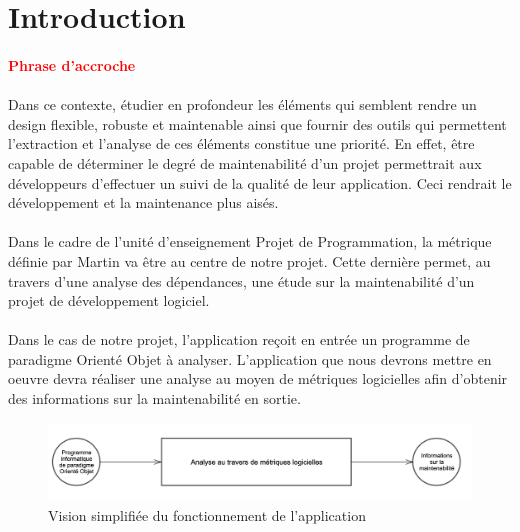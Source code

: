 \documentclass{scrartcl}
\newcommand{\TODO}[1] {
    \noindent \paragraph{\textcolor{red}{#1}}
}
\begin{document}

\section{Introduction}
    
    \TODO{Phrase d'accroche}

    \paragraph{}Dans ce contexte, étudier en profondeur les éléments qui semblent rendre un design flexible, robuste et maintenable ainsi que fournir des outils qui permettent l'extraction et l'analyse de ces éléments constitue une priorité. En effet, être capable de déterminer le degré de maintenabilité d'un projet permettrait aux développeurs d'effectuer un suivi de la qualité de leur application. Ceci rendrait le développement et la maintenance plus aisés.

    \paragraph{}Dans le cadre de l'unité d'enseignement \og Projet de Programmation\fg, la métrique définie par Martin\cite{Martin:1994} va être au centre de notre projet. Cette dernière permet, au travers d'une analyse des dépendances, une étude sur la maintenabilité d'un projet de développement logiciel.

    \paragraph{}Dans le cas de notre projet, l'application reçoit en entrée un programme de paradigme Orienté Objet à analyser. L'application que nous devrons mettre en oeuvre devra réaliser une analyse au moyen de métriques logicielles afin d'obtenir des informations sur la maintenabilité en sortie.

\begin{figure}[ht]
    \centering
    \includegraphics[scale=0.65]{img/intro.png}
    \caption{Vision simplifiée du fonctionnement de l'application} 
    \label{fig:intro}
\end{figure}
    
\end{document}

